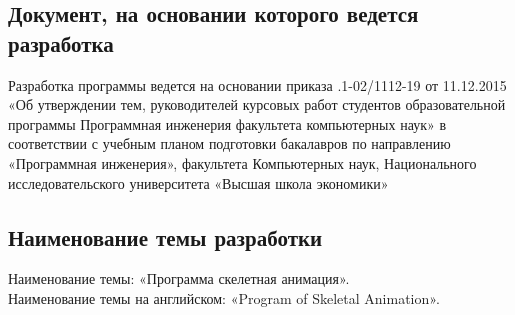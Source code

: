 \subsection{Документ, на основании которого ведется разработка}
Разработка программы ведется на основании приказа 
.1-02/1112-19 от 11.12.2015 
«Об  утверждении  тем,  руководителей  курсовых  работ  студентов
образовательной  программы  Программная  инженерия 
факультета 
компьютерных наук» в соответствии с учебным планом подготовки бакалавров по направлению «Программная инженерия», факультета Компьютерных наук,
Национального исследовательского университета «Высшая школа экономики» 


\subsection{Наименование темы разработки}
Наименование темы: «Программа скелетная анимация». \\
Наименование темы на английском: «Program of Skeletal Animation». \\
